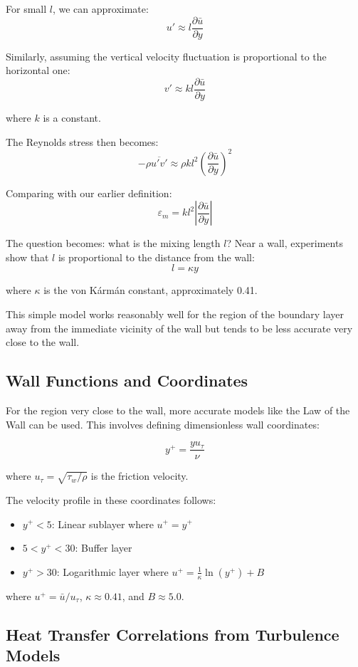 For small $l$, we can approximate:
\[
u' \approx l\frac{\partial \bar{u}}{\partial y}
\]

Similarly, assuming the vertical velocity fluctuation is proportional to the horizontal one:
\[
v' \approx kl\frac{\partial \bar{u}}{\partial y}
\]

where $k$ is a constant.

The Reynolds stress then becomes:
\[
-\rho\overline{u'v'} \approx \rho k l^2 \left(\frac{\partial \bar{u}}{\partial y}\right)^2
\]

Comparing with our earlier definition:
\[
\varepsilon_m = kl^2 \left|\frac{\partial \bar{u}}{\partial y}\right|
\]

The question becomes: what is the mixing length $l$? Near a wall, experiments show that $l$ is proportional to the distance from the wall:
\[
l = \kappa y
\]

where $\kappa$ is the von Kármán constant, approximately 0.41.

This simple model works reasonably well for the region of the boundary layer away from the immediate vicinity of the wall but tends to be less accurate very close to the wall.

\subsection*{Wall Functions and Coordinates}

For the region very close to the wall, more accurate models like the Law of the Wall can be used. This involves defining dimensionless wall coordinates:

\[
y^+ = \frac{y u_\tau}{\nu}
\]

where $u_\tau = \sqrt{\tau_w/\rho}$ is the friction velocity.

The velocity profile in these coordinates follows:
\begin{itemize}
    \item $y^+ < 5$: Linear sublayer where $u^+ = y^+$
    \item $5 < y^+ < 30$: Buffer layer
    \item $y^+ > 30$: Logarithmic layer where $u^+ = \frac{1}{\kappa}\ln(y^+) + B$
\end{itemize}

where $u^+ = \bar{u}/u_\tau$, $\kappa \approx 0.41$, and $B \approx 5.0$.

\subsection*{Heat Transfer Correlations from Turbulence Models}


